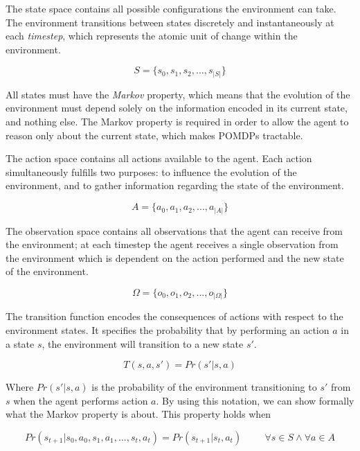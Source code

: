 The state space contains all possible configurations the environment can take.  The environment
transitions between states discretely and instantaneously at each \textit{timestep}, which
represents the atomic unit of change within the environment.

\begin{equation}
 S = \{s_0, s_1, s_2, ..., s_{|S|}\}
\end{equation}

All states must have the \textit{Markov} property, which means that the evolution of the environment
must depend solely on the information encoded in its current state, and nothing else. The Markov
property is required in order to allow the agent to reason only about the current state, which makes
POMDPs tractable.

The action space contains all actions available to the agent. Each action simultaneously fulfills
two purposes: to influence the evolution of the environment, and to gather information regarding the
state of the environment.

\begin{equation}
 A = \{ a_0, a_1, a_2, ..., a_{|A|} \}
\end{equation}

The observation space contains all observations that the agent can receive from the environment; at
each timestep the agent receives a single observation from the environment which is dependent on
the action performed and the new state of the environment.

\begin{equation}
 \Omega = \{ o_0, o_1, o_2, ..., o_{|\Omega|} \}
\end{equation}

The transition function encodes the consequences of actions with respect to the environment states.
It specifies the probability that by performing an action $a$ in a state $s$, the
environment will transition to a new state $s'$.

\begin{equation}
 T(s, a, s') = Pr(s' | s, a)
\end{equation}

Where $Pr(s'|s,a)$ is the probability of the environment transitioning to $s'$ from $s$ when the
agent performs action $a$. By using this notation, we can show formally what the Markov property is
about. This property holds when

\begin{equation}
 Pr(s_{t+1} | s_{0}, a_{0}, s_{1}, a_{1}, ..., s_{t}, a_{t} ) = Pr(s_{t+1} | s_t, a_t ) \hspace{1cm}
 \forall s \in S \wedge \forall a \in A
\end{equation}

